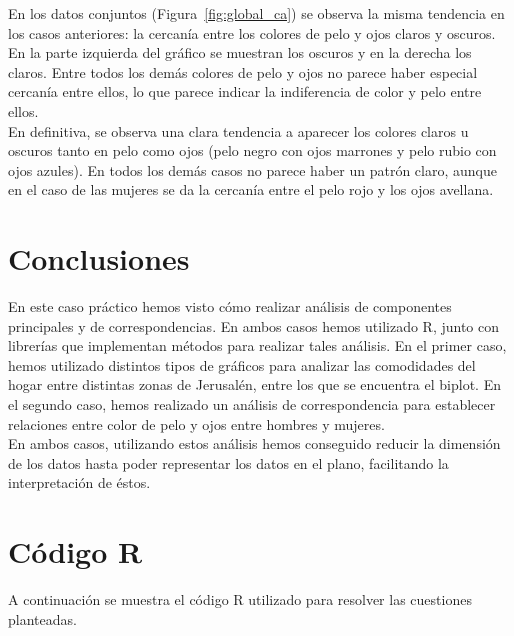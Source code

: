 \documentclass[12pt,a4paper,twoside,openright,titlepage,final]{article}
\begin{document}
En los datos conjuntos (Figura~\ref{fig:global_ca}) se observa la misma tendencia en los casos anteriores: la cercanía entre los colores de pelo y ojos claros y oscuros. En la parte izquierda del gráfico se muestran los oscuros y en la derecha los claros. Entre todos los demás colores de pelo y ojos no parece haber especial cercanía entre ellos, lo que parece indicar la indiferencia de color y pelo entre ellos.\\

En definitiva, se observa una clara tendencia a aparecer los colores claros u oscuros tanto en pelo como ojos (pelo negro con ojos marrones y pelo rubio con ojos azules). En todos los demás casos no parece haber un patrón claro, aunque en el caso de las mujeres se da la cercanía entre el pelo rojo y los ojos avellana. 

\section{Conclusiones}

En este caso práctico hemos visto cómo realizar análisis de componentes principales y de correspondencias. En ambos casos hemos utilizado R, junto con librerías que implementan métodos para realizar tales análisis. En el primer caso, hemos utilizado distintos tipos de gráficos para analizar las comodidades del hogar entre distintas zonas de Jerusalén, entre los que se encuentra el biplot. En el segundo caso, hemos realizado un análisis de correspondencia para establecer relaciones entre color de pelo y ojos entre hombres y mujeres.\\

En ambos casos, utilizando estos análisis hemos conseguido reducir la dimensión de los datos hasta poder representar los datos en el plano, facilitando la interpretación de éstos.

\clearpage

\section{Código R}

A continuación se muestra el código R utilizado para resolver las cuestiones planteadas.


\end{document}
